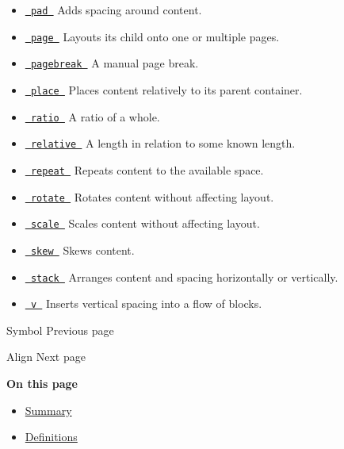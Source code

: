 \begin{itemize}
\item
  \href{/docs/reference/layout/pad/}{\texttt{\ pad\ }} { Adds spacing
  around content. }
\item
  \href{/docs/reference/layout/page/}{\texttt{\ page\ }} { Layouts its
  child onto one or multiple pages. }
\item
  \href{/docs/reference/layout/pagebreak/}{\texttt{\ pagebreak\ }} { A
  manual page break. }
\item
  \href{/docs/reference/layout/place/}{\texttt{\ place\ }} { Places
  content relatively to its parent container. }
\item
  \href{/docs/reference/layout/ratio/}{\texttt{\ ratio\ }} { A ratio of
  a whole. }
\item
  \href{/docs/reference/layout/relative/}{\texttt{\ relative\ }} { A
  length in relation to some known length. }
\item
  \href{/docs/reference/layout/repeat/}{\texttt{\ repeat\ }} { Repeats
  content to the available space. }
\item
  \href{/docs/reference/layout/rotate/}{\texttt{\ rotate\ }} { Rotates
  content without affecting layout. }
\item
  \href{/docs/reference/layout/scale/}{\texttt{\ scale\ }} { Scales
  content without affecting layout. }
\item
  \href{/docs/reference/layout/skew/}{\texttt{\ skew\ }} { Skews
  content. }
\item
  \href{/docs/reference/layout/stack/}{\texttt{\ stack\ }} { Arranges
  content and spacing horizontally or vertically. }
\item
  \href{/docs/reference/layout/v/}{\texttt{\ v\ }} { Inserts vertical
  spacing into a flow of blocks. }
\end{itemize}

\href{/docs/reference/symbols/symbol/}{\pandocbounded{}}

{ Symbol } { Previous page }

\href{/docs/reference/layout/align/}{\pandocbounded{}}

{ Align } { Next page }

\textbf{On this page}

\begin{itemize}
\tightlist
\item
  \hyperref[summary]{Summary}
\item
  \hyperref[definitions]{Definitions}
\end{itemize}

